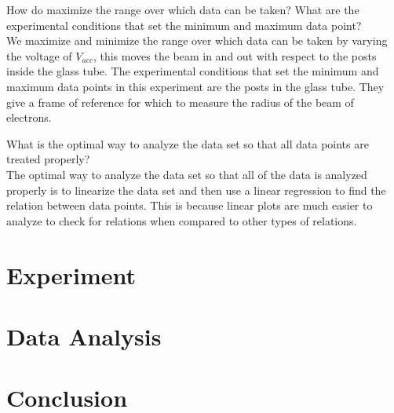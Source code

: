 \documentclass[aps,prl,10pt,twocolumn,floatfix]{revtex4-2}
\begin{document}
How do maximize the range over which data can be taken? What are the experimental conditions that
set the minimum and maximum data point?\\
We maximize and minimize the range over which data can be taken by varying the voltage of $V_{acc}$, this moves the beam in and out with respect to the posts inside the glass tube.
The experimental conditions that set the minimum and maximum data points in this experiment are the posts in the glass tube.
They give a frame of reference for which to measure the radius of the beam of electrons.

What is the optimal way to analyze the data set so that all data points are treated properly?\\
The optimal way to analyze the data set so that all of the data is analyzed properly is to linearize the data set and then use a linear regression to find the relation between data points.
This is because linear plots are much easier to analyze to check for relations when compared to other types of relations.

\section{Experiment}


\section{Data Analysis}

\section{Conclusion}
\end{document}
